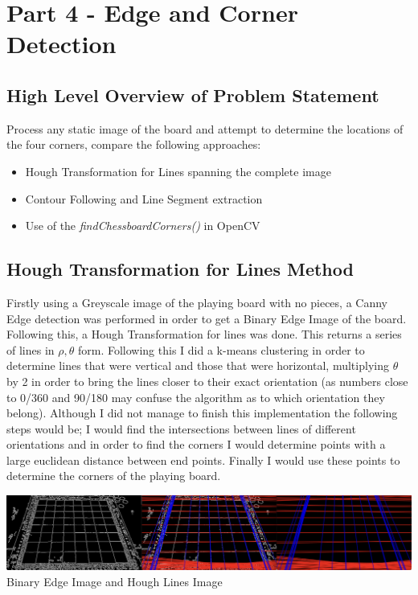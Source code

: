 \documentclass[12pt]{article}
\begin{document}
    \newpage
    \section{Part 4 - Edge and Corner Detection}

    \subsection{High Level Overview of Problem Statement}
    \par
    Process any static image of the board and attempt to determine the locations of the four corners, compare the following approaches:
    \begin{itemize}
        \item Hough Transformation for Lines spanning the complete image
        \item Contour Following and Line Segment extraction
        \item Use of the \emph{findChessboardCorners()} in OpenCV
    \end{itemize}
    \subsection{Hough Transformation for Lines Method}
    \par
    Firstly using a Greyscale image of the playing board with no pieces, a Canny Edge detection was performed in order to get a Binary Edge Image of the board. Following this, a Hough Transformation for lines was done. This returns a series of lines in \(\rho,\theta\) form.
    Following this I did a k-means clustering in order to determine lines that were vertical and those that were horizontal, multiplying \(\theta\) by 2 in order to bring the lines closer to their exact orientation (as numbers close to 0/360 and 90/180 may confuse the algorithm
    as to which orientation they belong). Although I did not manage to finish this implementation the following steps would be; I would find the intersections between lines of different orientations and in order to find the corners I would determine points with a large euclidean 
    distance between end points. Finally I would use these points to determine the corners of the playing board.
    \begin{center}
        \includegraphics[scale=0.3]{HoughLines.png}
        Binary Edge Image and Hough Lines Image
    \end{center}
    
\end{document}
